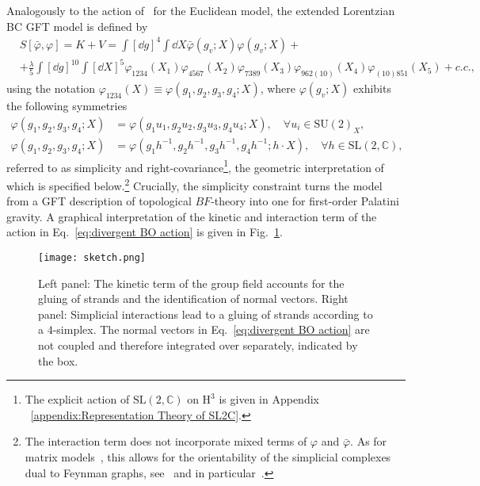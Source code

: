 \documentclass[11pt,a4paper]{article}
\newcommand{\C}{\mathbb C}
\newcommand{\SU}{\text{SU$(2)$}}
\newcommand{\SL}{\text{SL$(2,\C)$}}
\newcommand{\HH}{\text{H}^3}
\begin{document}
Analogously to the action of~\cite{Baratin:2011tx} for the Euclidean model, the extended Lorentzian BC GFT model is defined by
%
\begin{equation}\label{eq:divergent BO action}
\begin{aligned}
& S[\bar{\varphi},\varphi]
=
K + V
=
\int\left[\dd{g}\right]^4\int\dd{X}\bar{\varphi}(g_v;X)\varphi(g_v;X) + \\[7pt]
& +
\frac{\lambda}{5}\int\left[\dd{g}\right]^{10}\int\left[\dd{X}\right]^5 \varphi_{1234}(X_1)\varphi_{4567}(X_2)\varphi_{7389}(X_3)\varphi_{962(10)}(X_4)\varphi_{(10)851}(X_5) +c.c.,
\end{aligned}
\end{equation}
%
using the notation $\varphi_{1234}(X) \equiv \varphi(g_1, g_2, g_3 ,g_4;X)$, where $\varphi(g_v;X)$ exhibits the following symmetries
%
\begin{align}
\varphi(g_1,g_2,g_3,g_4;X) &= \varphi(g_1 u_1, g_2 u_2, g_3 u_3, g_4 u_4;X),\quad \forall u_i\in\SU_{X},\label{eq:generalized simplicity}\\[7pt]
\varphi(g_1,g_2,g_3,g_4;X) &= \varphi(g_1 h^{-1}, g_2 h^{-1}, g_3 h^{-1}, g_4 h^{-1}; h\cdot X),\quad \forall h\in\SL,\label{eq:covariance under right}
\end{align}
%
referred to as simplicity and right-covariance\footnote{The explicit action of $\SL$ on $\HH$ is given in Appendix ~\ref{appendix:Representation Theory of SL2C}.}, the geometric interpretation of which is specified below.\footnote{The interaction term does not incorporate mixed terms of $\varphi$ and $\bar{\varphi}$. As for matrix models~\cite{DiFrancesco:1993cyw}, this allows for the orientability of the simplicial complexes dual to Feynman graphs, see~\cite{Gurau:2011xp} and in particular~\cite{Caravelli:2010nh}.} Crucially, the simplicity constraint turns the model from a GFT description of topological $BF$-theory into one for first-order Palatini gravity. A graphical interpretation of the kinetic and interaction term of the action in Eq.~\eqref{eq:divergent BO action} is given in Fig.~\ref{fig:sketch}.
%
\begin{figure}[h!]
    \centering
    \texttt{[image: sketch.png]}
    \caption{Left panel: The kinetic term of the group field accounts for the gluing of strands and the identification of normal vectors. Right panel: Simplicial interactions lead to a gluing of strands according to a $4$-simplex. The normal vectors in Eq.~\eqref{eq:divergent BO action} are not coupled and therefore integrated over separately, indicated by the box.}
    \label{fig:sketch}
\end{figure}
\end{document}
